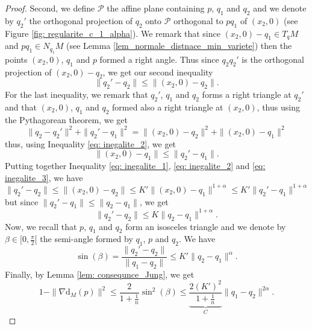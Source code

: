 \documentclass[11pt,reqno,a4paper]{article}%
\theoremstyle{definition}
\theoremstyle{remark}
\renewcommand{\leq}{\leqslant}
\renewcommand{\d}{\mathrm{d}}
\renewcommand{\d}{\mathrm{d}}
\begin{document}
\begin{proof}
\noindent Second, we define $\mathscr{P}$ the affine plane containing $p$, $q_1$ and $q_2$ and we denote by $q_2'$ the orthogonal projection of $q_2$ onto $\mathscr{P}$ orthogonal to ${pq_1}$ of $(x_2,0)$ (see Figure \ref{fig: regularite_c_1_alpha}). 
We remark that since $(x_2,0) - q_1 \in T_q M$ and ${pq_1} \in N_{q_1} M$ (see Lemma \ref{lem_normale_distnace_min_variete}) then the points $(x_2,0)$, $q_1$ and $p$ formed a right angle.
Thus since ${q_2 q_2'}$ is the orthogonal projection of $(x_2,0) - q_2$, we get our second inequality
\begin{equation} \label{eq: inegalite_2}
    \| q_2' - q_2 \| \leq \| (x_2,0) - q_2 \|.
\end{equation}
For the last inequality, we remark that $q_2'$, $q_1$ and $q_2$ forms a right triangle at $q_2'$ and that $(x_2,0)$, $q_1$ and $q_2$ formed also a right triangle at $(x_2,0)$, thus using the Pythagorean theorem, we get
\[ \|q_2 - q_2' \|^2 + \| q_2' - q_1 \|^2 =  \|(x_2,0) - q_2 \|^2 + \| (x_2,0) - q_1 \|^2\]
thus, using Inequality \eqref{eq: inegalite_2}, we get
\begin{equation} \label{eq: inegalite_3}
     \| (x_2,0) - q_1 \| \leq  \| q_2' - q_1 \|.
\end{equation}
Putting together Inequality \eqref{eq: inegalite_1}, \eqref{eq: inegalite_2} and \eqref{eq: inegalite_3}, we have
\[  \| q_2' - q_2 \| \leq \| (x_2,0) - q_2 \| \leq   K' \| (x_2,0) - q_1 \|^{1+\alpha} \leq  K' \| q_2' - q_1 \|^{1+\alpha} \]
but since $\| q_2' - q_1 \| \leq \| q_2 -q_1 \|$, we get
\[  \| q_2' - q_2 \| \leq  K \| q_2 - q_1 \|^{1+\alpha}.\]
Now, we recall that $p$, $q_1$ and $q_2$ form an isosceles triangle and we denote by $\beta \in [0,\frac{\pi}{2}[$ the semi-angle formed by $q_1$, $p$ and $q_2$.
We have
\[ \sin(\beta) = \frac{\| q_2'-q_2\|}{\|q_1-q_2\|} \leq  K' \| q_2 - q_1 \|^{\alpha}. \]
Finally, by Lemma \ref{lem: consequnce_Jung}, we get
\[1 - \| \nabla \d_M(p) \|^2 \leq \frac{2}{1 + \frac{1}{n}} \sin^2(\beta) \leq \underbrace{\frac{2 (K')^2}{1 + \frac{1}{n}}}_{C} \|q_1-q_2\|^{2\alpha}.\]
\end{proof}

\end{document}
